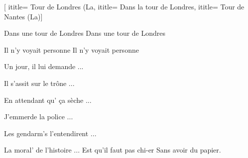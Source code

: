  [
ititle= {Tour de Londres (La},
ititle= {Dans la tour de Londres},
ititle= {Tour de Nantes (La)}]


\beginverse
Dans une tour de Londres
Dans une tour de Londres
\endverse

\beginverse
Il n'y voyait personne
Il n'y voyait personne
\endverse

\beginverse
Un jour, il lui demande ...
\endverse

\beginverse
Il s'assit sur le trône ...
\endverse

\beginverse
En attendant qu' ça sèche ...
\endverse

\beginverse
J'emmerde la police ...
\endverse

\beginverse
Les gendarm's l'entendirent ...
\endverse

\beginverse
La moral' de l'histoire ...
Est qu'il faut pas chi-er
Sans avoir du papier.
\endverse

\endsong